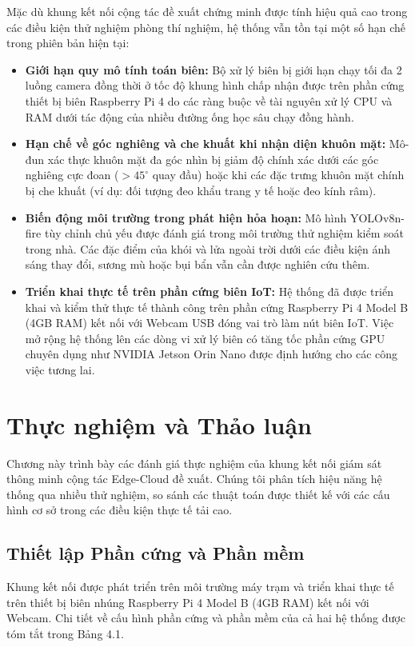 \documentclass[12pt,a4paper]{article}
\begin{document}
Mặc dù khung kết nối cộng tác đề xuất chứng minh được tính hiệu quả cao trong các điều kiện thử nghiệm phòng thí nghiệm, hệ thống vẫn tồn tại một số hạn chế trong phiên bản hiện tại:
\begin{itemize}
    \item \textbf{Giới hạn quy mô tính toán biên:} Bộ xử lý biên bị giới hạn chạy tối đa 2 luồng camera đồng thời ở tốc độ khung hình chấp nhận được trên phần cứng thiết bị biên Raspberry Pi 4 do các ràng buộc về tài nguyên xử lý CPU và RAM dưới tác động của nhiều đường ống học sâu chạy đồng hành.
    \item \textbf{Hạn chế về góc nghiêng và che khuất khi nhận diện khuôn mặt:} Mô-đun xác thực khuôn mặt đa góc nhìn bị giảm độ chính xác dưới các góc nghiêng cực đoan ($>45^{\circ}$ quay đầu) hoặc khi các đặc trưng khuôn mặt chính bị che khuất (ví dụ: đối tượng đeo khẩu trang y tế hoặc đeo kính râm).
    \item \textbf{Biến động môi trường trong phát hiện hỏa hoạn:} Mô hình YOLOv8n-fire tùy chỉnh chủ yếu được đánh giá trong môi trường thử nghiệm kiểm soát trong nhà. Các đặc điểm của khói và lửa ngoài trời dưới các điều kiện ánh sáng thay đổi, sương mù hoặc bụi bẩn vẫn cần được nghiên cứu thêm.
    \item \textbf{Triển khai thực tế trên phần cứng biên IoT:} Hệ thống đã được triển khai và kiểm thử thực tế thành công trên phần cứng Raspberry Pi 4 Model B (4GB RAM) kết nối với Webcam USB đóng vai trò làm nút biên IoT. Việc mở rộng hệ thống lên các dòng vi xử lý biên có tăng tốc phần cứng GPU chuyên dụng như NVIDIA Jetson Orin Nano được định hướng cho các công việc tương lai.
\end{itemize}

\newpage

\section{Thực nghiệm và Thảo luận}

Chương này trình bày các đánh giá thực nghiệm của khung kết nối giám sát thông minh cộng tác Edge-Cloud đề xuất. Chúng tôi phân tích hiệu năng hệ thống qua nhiều thử nghiệm, so sánh các thuật toán được thiết kế với các cấu hình cơ sở trong các điều kiện thực tế tải cao.

\subsection{Thiết lập Phần cứng và Phần mềm}
Khung kết nối được phát triển trên môi trường máy trạm và triển khai thực tế trên thiết bị biên nhúng Raspberry Pi 4 Model B (4GB RAM) kết nối với Webcam. Chi tiết về cấu hình phần cứng và phần mềm của cả hai hệ thống được tóm tắt trong Bảng 4.1.
\end{document}
